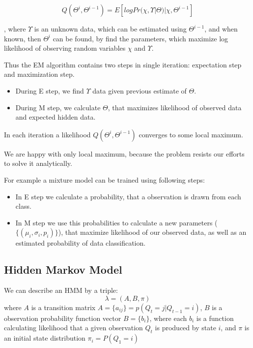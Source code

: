 \documentclass[12pt,a4paper,english]{article}
\begin{document}
\begin{equation}
    Q(\Theta^i,\Theta^{ i-1})= E[log Pr(\chi, \Upsilon | \Theta) | \chi, \Theta^{i-1}]
\end{equation}

 , where $\Upsilon$ is an unknown data, which can be estimated using $\Theta^{i-1}$, and when known, then $\Theta^{i}$ can be found, by find the parameters, which maximize log likelihood of observing random variables $\chi$ and $\Upsilon$. \newline


Thus the EM algorithm contains two steps in single iteration: \newline
    expectation step and maximization step. \newline
\begin{itemize}
	\item During E step, we find $\Upsilon$ data given previous estimate of $\Theta$.
	\item During M step, we calculate $\Theta$, that maximizes likelihood of observed data and expected hidden data.
\end{itemize}
In each iteration a likelihood $Q(\Theta^i,\Theta^{ i-1})$ converges to some local maximum. \newline

We are happy with only local maximum, because the problem resists our efforts to solve it analytically. \newline


For example a mixture model can be trained using following steps: \newline
\begin{itemize}
    \item In E step we calculate a probability, that a observation is drawn from each class.
    \item In M step we use this probabilities to calculate a new parameters ($\{(\mu_i, \sigma_i, p_i)\}$), that maximize likelihood of our observed data, as well as an estimated probability of data classification.
\end{itemize}

\newpage
\subsection{Hidden Markov Model}

We can describe an HMM by a triple:
\begin{equation}
    \lambda=(A, B, \pi)
\end{equation}
 where $A$ is a transition matrix $A = \{ a_{ij} \} = p(Q_t=j | Q_{t-1}=i)$, \newline
 $B$ is a observation probability function vector $B = \{ b_i \}$, where each $b_i$ is a function calculating likelihood that a given observation $Q_t$  is produced by state $i$, \newline
 and $\pi$ is an initial state distribution  $\pi_i=P(Q_1=i)$ \newline
\end{document}
